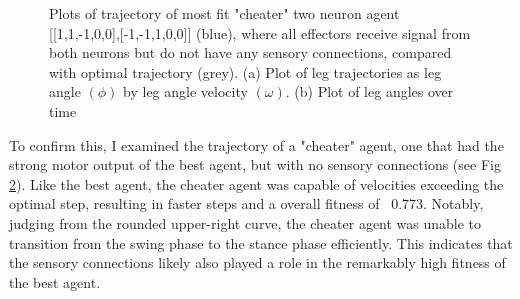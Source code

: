 \documentclass{article}
\begin{document}
\begin{figure}[htbp]
\begin{subfigure}[b]{0.5\textwidth}
    \caption{}
    \label{fig:AngleTimePlot2Cheat}
  \end{subfigure}
  \caption{Plots of trajectory of most fit "cheater" two neuron agent [[1,1,-1,0,0],[-1,-1,1,0,0]] (blue), where all effectors receive signal from both neurons but do not have any sensory connections, compared with optimal trajectory (grey). (a) Plot of leg trajectories as leg angle \((\phi)\) by leg angle velocity \((\omega)\). (b) Plot of leg angles over time}
  \label{fig:plots2Cheat}
\end{figure} 

To confirm this, I examined the trajectory of a "cheater" agent, one that had the strong motor output of the best agent, but with no sensory connections (see Fig \ref{fig:plots2Cheat}). Like the best agent, the cheater agent was capable of velocities exceeding the optimal step, resulting in faster steps and a overall fitness of ~0.773. Notably, judging from the rounded upper-right curve, the cheater agent was unable to transition from the swing phase to the stance phase efficiently. This indicates that the sensory connections likely also played a role in the remarkably high fitness of the best agent.
\end{document}
